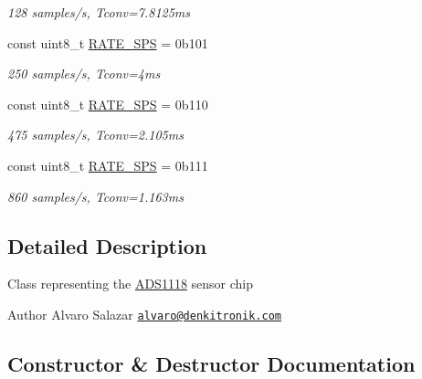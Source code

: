 \begin{DoxyCompactItemize}
\begin{DoxyCompactList}\small\item\em 128 samples/s, Tconv=7.\+8125ms \end{DoxyCompactList}\item 
\mbox{\label{class_a_d_s1118_a6deae5bd5b8578a481b376349edcebe1}} 
const uint8\+\_\+t \mbox{\hyperlink{class_a_d_s1118_a6deae5bd5b8578a481b376349edcebe1}{R\+A\+T\+E\+\_\+S\+PS}} = 0b101
\begin{DoxyCompactList}\small\item\em 250 samples/s, Tconv=4ms \end{DoxyCompactList}\item 
\mbox{\label{class_a_d_s1118_a5682051293d721f5efc05d05f997d150}} 
const uint8\+\_\+t \mbox{\hyperlink{class_a_d_s1118_a5682051293d721f5efc05d05f997d150}{R\+A\+T\+E\+\_\+S\+PS}} = 0b110
\begin{DoxyCompactList}\small\item\em 475 samples/s, Tconv=2.\+105ms \end{DoxyCompactList}\item 
\mbox{\label{class_a_d_s1118_adaff9f6a747f4b3b6cb10608b8581ab0}} 
const uint8\+\_\+t \mbox{\hyperlink{class_a_d_s1118_adaff9f6a747f4b3b6cb10608b8581ab0}{R\+A\+T\+E\+\_\+S\+PS}} = 0b111
\begin{DoxyCompactList}\small\item\em 860 samples/s, Tconv=1.\+163ms \end{DoxyCompactList}\end{DoxyCompactItemize}


\subsection{Detailed Description}
Class representing the \mbox{\hyperlink{class_a_d_s1118}{A\+D\+S1118}} sensor chip \begin{DoxyAuthor}{Author}
Alvaro Salazar \href{mailto:alvaro@denkitronik.com}{\tt alvaro@denkitronik.\+com} 
\end{DoxyAuthor}


\subsection{Constructor \& Destructor Documentation}
\mbox{\label{class_a_d_s1118_afaddf1d46e3b32d433c67122d96a6ebb}} 
